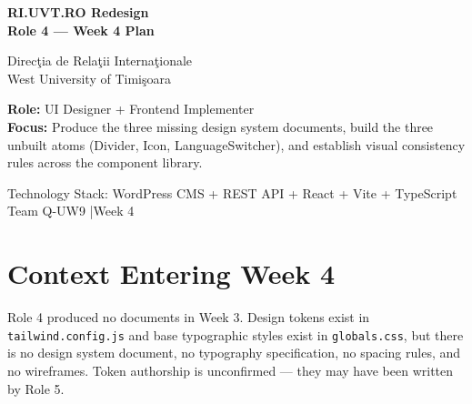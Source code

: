 \documentclass[12pt,a4paper]{article}
\begin{document}

\begin{titlepage}
    \pagecolor{uvtDarkBlue}
    \color{white}

    \vspace*{2cm}

    {\Huge\bfseries RI.UVT.RO Redesign\\[0.25em]
    Role 4 --- Week 4 Plan\par}

    \vspace{0.8cm}

    {\Large Direc\c{t}ia de Rela\c{t}ii Interna\c{t}ionale\\
    West University of Timi\c{s}oara\par}

    \vspace{1.5cm}

    \begin{yellowbox}
        \color{textGray}
        \textbf{Role:} UI Designer + Frontend Implementer\\[0.3em]
        \textbf{Focus:} Produce the three missing design system documents,
        build the three unbuilt atoms (Divider, Icon, LanguageSwitcher),
        and establish visual consistency rules across the component library.
    \end{yellowbox}

    \vfill

    {\large Technology Stack: WordPress CMS + REST API + React + Vite + TypeScript\\[0.4em]
    Team Q-UW9 \quad|\quad Week 4}

    \vspace{1cm}
\end{titlepage}

\nopagecolor
\color{textGray}

\tableofcontents
\newpage

\section{Context Entering Week 4}

\begin{redbox}
Role 4 produced no documents in Week 3. Design tokens exist in \texttt{tailwind.config.js}
and base typographic styles exist in \texttt{globals.css}, but there is no design system
document, no typography specification, no spacing rules, and no wireframes. Token
authorship is unconfirmed --- they may have been written by Role 5.
\end{redbox}
\end{document}
